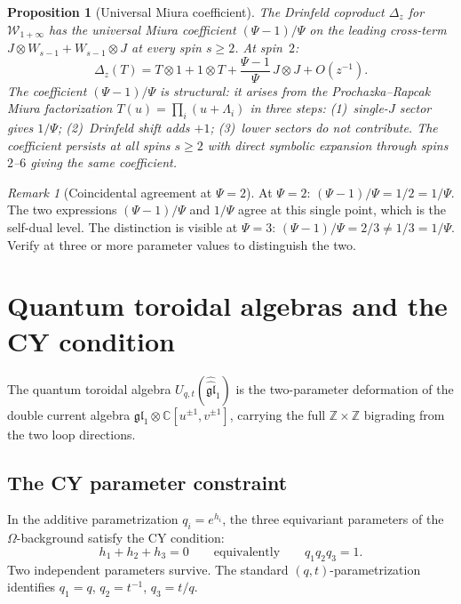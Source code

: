 \documentclass[11pt]{article}
\theoremstyle{plain}
\newtheorem{proposition}[theorem]{Proposition}
\theoremstyle{definition}
\theoremstyle{remark}
\newtheorem{remark}[theorem]{Remark}
\newcommand{\fgl}{\mathfrak{gl}}
\newcommand{\cW}{\mathcal{W}}
\newcommand{\bC}{\mathbb{C}}
\newcommand{\bZ}{\mathbb{Z}}
\begin{document}
\begin{proposition}[Universal Miura coefficient]
\label{prop:v3-qg-miura-universal}
The Drinfeld coproduct $\Delta_z$ for $\cW_{1+\infty}$ has the
universal Miura coefficient $(\Psi - 1)/\Psi$ on the leading
cross-term $J \otimes W_{s-1} + W_{s-1} \otimes J$ at every spin
$s \geq 2$.  At spin~$2$:
\[
 \Delta_z(T)
 = T \otimes 1 + 1 \otimes T
 + \frac{\Psi - 1}{\Psi}\,J \otimes J
 + O(z^{-1}).
\]
The coefficient $(\Psi - 1)/\Psi$ is structural: it arises from
the Prochazka--Rapcak Miura factorization $T(u) =
\prod_i (u + \Lambda_i)$ in three steps: (1)~single-$J$ sector
gives $1/\Psi$; (2)~Drinfeld shift adds $+1$; (3)~lower sectors do
not contribute.  The coefficient persists at all spins $s \geq 2$ with
direct symbolic expansion through spins $2$--$6$ giving the same
coefficient.
\end{proposition}

\begin{remark}[Coincidental agreement at $\Psi = 2$]
\label{rem:v3-qg-psi2-coincidence}
At $\Psi = 2$: $(\Psi - 1)/\Psi = 1/2 = 1/\Psi$.  The two
expressions $(\Psi - 1)/\Psi$ and $1/\Psi$ agree at this single
point, which is the self-dual level.  The distinction is visible at
$\Psi = 3$: $(\Psi - 1)/\Psi = 2/3 \neq 1/3 = 1/\Psi$.  Verify
at three or more parameter values to distinguish the two.
\end{remark}



\section{Quantum toroidal algebras and the CY condition}
\label{sec:toroidal}

The quantum toroidal algebra
$U_{q,t}(\widehat{\widehat{\fgl}}_1)$ is the two-parameter
deformation of the double current algebra $\fgl_1 \otimes
\bC[u^{\pm 1}, v^{\pm 1}]$, carrying the full
$\bZ \times \bZ$ bigrading from the two loop directions.

\subsection{The CY parameter constraint}

In the additive parametrization $q_i = e^{h_i}$, the three
equivariant parameters of the $\Omega$-background satisfy the CY
condition:
\[
 h_1 + h_2 + h_3 = 0
 \qquad\text{equivalently}\qquad
 q_1 q_2 q_3 = 1.
\]
Two independent parameters survive.  The standard
$(q,t)$-parametrization identifies $q_1 = q$, $q_2 = t^{-1}$,
$q_3 = t/q$.
\end{document}
